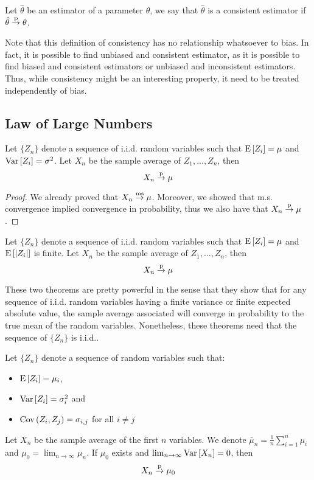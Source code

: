 \begin{definition}
Let $\hat\theta$ be an estimator of a parameter $\theta$, we say that $\hat\theta$ is a consistent estimator if $\hat\theta\overset{\text{p}}{\to} \theta$.
\end{definition}

Note that this definition of consistency has no relationship whatsoever to bias. In fact, it is possible to find unbiased and consistent estimator, as it is possible to find biased and consistent estimators or unbiased and inconsistent estimators. Thus, while consistency might be an interesting property, it need to be treated independently of bias.

\subsection{Law of Large Numbers}

\begin{theorem}
Let $\{Z_n\}$ denote a sequence of i.i.d. random variables such that $\operatorname{E}\left[Z_i\right] = \mu$ and $\operatorname{Var}\left[Z_i\right] = \sigma^2$. Let $X_n$ be the sample average of $Z_1, ..., Z_n$, then $$ X_n \overset{\text{p}}{\to} \mu $$
\end{theorem}
\begin{proof}
We already proved that $X_n \overset{\text{ms}}{\to} \mu$. Moreover, we showed that m.s. convergence implied convergence in probability, thus we also have that $X_n \overset{\text{p}}{\to} \mu$.
\end{proof}

\begin{theorem}
Let $\{Z_n\}$ denote a sequence of i.i.d. random variables such that $\operatorname{E}\left[Z_i\right] = \mu$ and $\operatorname{E}\left[\lvert Z_i \rvert\right]$ is finite. Let $X_n$ be the sample average of $Z_1, ..., Z_n$, then $$ X_n \overset{\text{p}}{\to} \mu $$
\end{theorem}

These two theorems are pretty powerful in the sense that they show that for any sequence of i.i.d. random variables having a finite variance or finite expected absolute value, the sample average associated will converge in probability to the true mean of the random variables. Nonetheless, these theorems need that the sequence of $\{Z_n\}$ is i.i.d..

\begin{theorem}
Let $\{Z_n\}$ denote a sequence of random variables such that:\begin{itemize}
\item $\operatorname{E}\left[Z_i\right] = \mu_i$,
\item $\operatorname{Var}\left[Z_i\right] = \sigma_i^2$ and
\item $\operatorname{Cov}\left(Z_i, Z_j\right) = \sigma_{i,j}$ for all $i\neq j$
\end{itemize} 
Let $X_n$ be the sample average of the first $n$ variables. We denote $\bar\mu_n = \frac{1}{n} \sum_{i=1}^{n} \mu_i$ and $\mu_0 = \lim_{n\to\infty} \mu_n$. If $\mu_0$ exists and $\lim_{n\to\infty} \operatorname{Var}\left[X_n\right] = 0$, then $$ X_n\overset{\text{p}}{\to} \mu_0 $$
\end{theorem}

